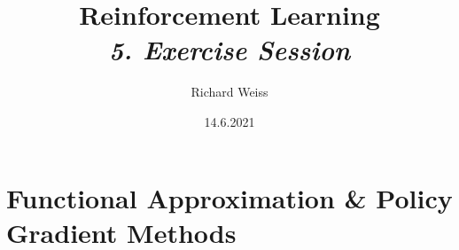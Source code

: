 \documentclass{article}
\title
{
    Reinforcement Learning \\
    \vspace{4pt}
    \normalsize
    \textit{5. Exercise Session}
}
\author{Richard Weiss}
\date{14.6.2021}
\numberwithin{figure}{section}
\begin{document}
\maketitle

\setcounter{section}{8}
\section{Functional Approximation \& Policy Gradient Methods}











\printbibliography
\end{document}
